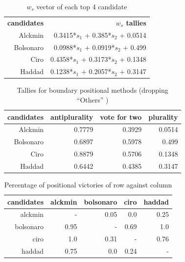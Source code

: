 \documentclass[hidelinks,11pt]{article}
\begin{document}
\begin{table}
  \centering
  \begin{tabular}{rr}
    \hline\hline
    \textbf{candidates} & \textbf{\(w_s\) tallies} \\
    Alckmin & 0.3415*\(s_1\) + 0.385*\(s_2\) + 0.0514 \\
    Bolsonaro & 0.0988*\(s_1\) + 0.0919*\(s_2\) + 0.499 \\
    Ciro & 0.4358*\(s_1\) + 0.3173*\(s_2\) + 0.1348 \\
    Haddad & 0.1238*\(s_1\) + 0.2057*\(s_2\) + 0.3147 \\\hline\hline
  \end{tabular}
  \caption{\(w_{s}\) vector of each top 4 candidate}
\end{table}


\begin{table}[]
    \centering
\begin{tabular}{|r|r|r|r|}
\hline
\textbf{candidates} & \textbf{antiplurality} & \textbf{vote for two} & \textbf{plurality} \\ \hline
Alckmin             & 0.7779                 & 0.3929                & 0.0514             \\ \hline
Bolsonaro           & 0.6897                 & 0.5978                & 0.499              \\ \hline
Ciro                & 0.8879                 & 0.5706                & 0.1348             \\ \hline
Haddad              & 0.6442                 & 0.4385                & 0.3147             \\ \hline
\end{tabular}
\caption{Tallies for boundary positional methods (dropping ``Others'' )}
\end{table}




\begin{table}[]
  \centering
\begin{tabular}{|r|r|r|r|r|}
\hline
\textbf{candidates} & \textbf{alckmin} & \textbf{bolsonaro} & \textbf{ciro} & \textbf{haddad} \\ \hline
alckmin             & -             & 0.05               & 0.0           & 0.25            \\ \hline
bolsonaro           & 0.95             & -            & 0.69          & 1.0             \\ \hline
ciro                & 1.0              & 0.31               & -           & 0.76            \\ \hline
haddad              & 0.75             & 0.0                & 0.24          & -            \\ \hline
\end{tabular}
\caption{Percentage of positional victories of row against column}
\end{table}
\end{document}
